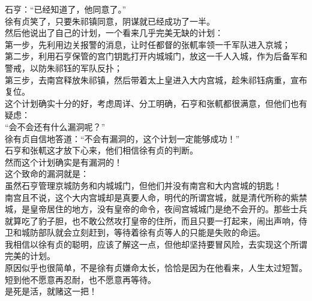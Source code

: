 \begin{multicols}{\theparacolNo}
石亨：“已经知道了，他同意了。”\\

徐有贞笑了，只要朱祁镇同意，阴谋就已经成功了一半。\\

然后他说出了自己的计划，一个看来几乎完美无缺的计划：\\

第一步，先利用边关报警的消息，让时任都督的张軏率领一千军队进入京城；\\

第二步，利用石亨保管的宫门钥匙打开内城城门，放这一千人入城，作为后备军和警戒，以防朱祁钰的军队反扑；\\

第三步，去南宫释放朱祁镇，然后带着太上皇进入大内宫城，趁朱祁钰病重，宣布复位。\\

这个计划确实十分的好，考虑周详、分工明确，石亨和张軏都很满意，但他们也有疑虑：\\

“会不会还有什么漏洞呢？”\\

徐有贞自信地答道：“不会有漏洞的，这个计划一定能够成功！”\\

石亨和张軏这才放下心来，他们相信徐有贞的判断。\\

然而这个计划确实是有漏洞的！\\

这个致命的漏洞就是：\\

虽然石亨管理京城防务和内城城门，但他们并没有南宫和大内宫城的钥匙！\\

南宫且不说，这个大内宫城却是真要人命，明代的所谓宫城，就是清代所称的紫禁城，是皇帝居住的地方，没有皇帝的命令，夜间宫城城门是绝不会开的。那些士兵就算吃了豹子胆，也不敢公然攻打皇帝的住所，而且只要一打起来，闹出声响，侍卫和城防部队就会立刻赶到，等待着徐有贞等人的只能是失败的命运。\\

我相信以徐有贞的聪明，应该了解这一点，但他却坚持要冒风险，去实现这个所谓完美的计划。\\

原因似乎也很简单，不是徐有贞嫌命太长，恰恰是因为在他看来，人生太过短暂。短到他不愿意再忍耐，也不愿意再等待。\\

是死是活，就赌这一把！\\


\end{multicols}
